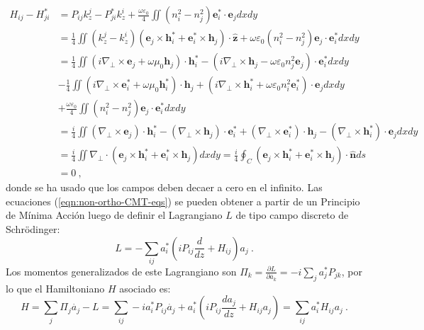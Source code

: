 \begin{align*}
 H_{ij} - H_{ji}^* &= P_{ij} k_z^j - P_{ji}^* k_z^i  + \frac{\omega \varepsilon_0}{4} \iint(n_i^2-n_j^2) \textbf{e}_i^* \cdot \textbf{e}_j dxdy
\\
&= \frac{1}{4} \iint (k_z^j-k_z^i)( \textbf{e}_j \times  \textbf{h}_i^* + \textbf{e}_i^* \times  \textbf{h}_j  )\cdot\hat{\textbf{z}} + \omega\varepsilon_0 (n_i^2-n_j^2) \textbf{e}_j \cdot \textbf{e}_i^* dxdy
\\
&= \frac{1}{4} \iint \left( i\nabla_\perp \times \textbf{e}_j +\omega\mu_0 \textbf{h}_j \right) \cdot \textbf{h}_i^* - \left( i\nabla_\perp \times \textbf{h}_j  - \omega\varepsilon_0n_j^2 \textbf{e}_j \right) \cdot \textbf{e}_i^*dxdy
\\
&- \frac{1}{4} \iint \left( i\nabla_\perp \times \textbf{e}_i^* +\omega\mu_0 \textbf{h}_i^*\right) \cdot \textbf{h}_j + \left(i\nabla_\perp \times \textbf{h}_i^*  + \omega\varepsilon_0n_i^2 \textbf{e}_i^* \right) \cdot \textbf{e}_jdxdy
\\
&+\frac{\omega\varepsilon_0}{4}\iint  \left(n_i^2-n_j^2\right) \textbf{e}_j \cdot \textbf{e}_i^* dxdy
\\
&= \frac{i}{4} \iint \left(\nabla_\perp\times\textbf{e}_j\right) \cdot \textbf{h}_i^*  -\left(\nabla_\perp\times\textbf{h}_j\right) \cdot \textbf{e}_i^* + \left(\nabla_\perp\times\textbf{e}_i^*\right) \cdot \textbf{h}_j - \left(\nabla_\perp\times\textbf{h}_i^*\right) \cdot \textbf{e}_j dxdy
\\
&= \frac{i}{4} \iint \nabla_\perp\cdot\left(\textbf{e}_j \times \textbf{h}_i^* +\textbf{e}_i^* \times \textbf{h}_j\right) dxdy =
\frac{i}{4} \oint_C \left(\textbf{e}_j \times \textbf{h}_i^* +\textbf{e}_i^* \times \textbf{h}_j\right) \cdot \hat{\textbf{n}} ds
\\
&=
0 \ ,
	\end{align*}
donde se ha usado que los campos deben decaer a cero en el infinito. Las ecuaciones (\ref{eqn:non-ortho-CMT-eqs}) se pueden obtener a partir de un Principio de Mínima Acción luego de definir el Lagrangiano $L$ de tipo campo discreto de Schrödinger:
\begin{equation}
	L = -\sum_{ij}  a_i^*\left(i  P_{ij} \frac{d }{dz} + H_{ij}  \right)a_j \ .
\end{equation}
Los momentos generalizados de este Lagrangiano son $\Pi_k=\frac{\partial L}{\partial \dot{a_k}} = -i\sum_{j} a_j^* P_{jk}$, por lo que el Hamiltoniano $H$ asociado es:
\begin{equation}
H = \sum_{j} \Pi_j \dot{a_j} - L = \sum_{ij} -ia_i^* P_{ij} \dot{a_j} + a_i^*\left(i  P_{ij} \frac{d a_j}{dz} + H_{ij} a_j \right) = \sum_{ij} a_i^* H_{ij} a_j \ .
\end{equation}
